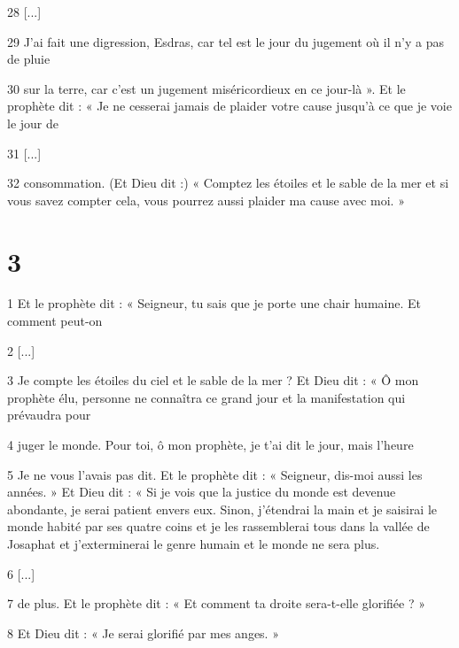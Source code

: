 \par 28 [...]

\par 29 J'ai fait une digression, Esdras, car tel est le jour du jugement où il n'y a pas de pluie

\par 30 sur la terre, car c'est un jugement miséricordieux en ce jour-là ». Et le prophète dit : « Je ne cesserai jamais de plaider votre cause jusqu'à ce que je voie le jour de

\par 31 [...]

\par 32 consommation. (Et Dieu dit :) « Comptez les étoiles et le sable de la mer et si vous savez compter cela, vous pourrez aussi plaider ma cause avec moi. »

\chapter{3}

\par 1 Et le prophète dit : « Seigneur, tu sais que je porte une chair humaine. Et comment peut-on

\par 2 [...]

\par 3 Je compte les étoiles du ciel et le sable de la mer ? Et Dieu dit : « Ô mon prophète élu, personne ne connaîtra ce grand jour et la manifestation qui prévaudra pour

\par 4 juger le monde. Pour toi, ô mon prophète, je t'ai dit le jour, mais l'heure

\par 5 Je ne vous l'avais pas dit. Et le prophète dit : « Seigneur, dis-moi aussi les années. » Et Dieu dit : « Si je vois que la justice du monde est devenue abondante, je serai patient envers eux. Sinon, j'étendrai la main et je saisirai le monde habité par ses quatre coins et je les rassemblerai tous dans la vallée de Josaphat et j'exterminerai le genre humain et le monde ne sera plus.

\par 6 [...]

\par 7 de plus. Et le prophète dit : « Et comment ta droite sera-t-elle glorifiée ? »

\par 8 Et Dieu dit : « Je serai glorifié par mes anges. »

